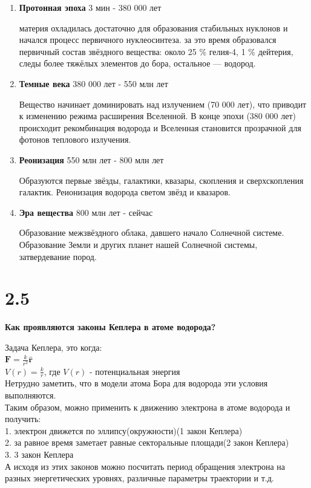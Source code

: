 \documentclass[a4paper,14pt]{article}
\begin{document}
\begin{enumerate}
\item \textbf{Протонная эпоха} 3 мин - 380 000 лет

материя охладилась достаточно для образования стабильных нуклонов и начался процесс первичного нуклеосинтеза. за это время образовался первичный состав звёздного вещества: около 25 $\%$ гелия-4, 1 $\%$ дейтерия, следы более тяжёлых элементов до бора, остальное — водород.

\item \textbf{Темные века} 380 000 лет - 550 млн лет

Вещество начинает доминировать над излучением (70 000 лет), что приводит к изменению режима расширения Вселенной. В конце эпохи (380 000 лет) происходит рекомбинация водорода и Вселенная становится прозрачной для фотонов теплового излучения.

\item \textbf{Реонизация} 550 млн лет - 800 млн лет

Образуются первые звёзды, галактики, квазары, скопления и сверхскопления галактик. Реионизация водорода светом звёзд и квазаров.

\item \textbf{Эра вещества} 800 млн лет - сейчас

Образование межзвёздного облака, давшего начало Солнечной системе. Образование Земли и других планет нашей Солнечной системы, затвердевание пород.
\end{enumerate}

\section*{2.5}

\begin{center}
	\LARGE{\textbf{Как проявляются законы Кеплера в атоме водорода?}}\\
\end{center}

Задача Кеплера, это когда:\\
$\mathbf {F} ={\frac {k}{r^{2}}}\mathbf {\hat {r}}$\\
$V(r)={\frac {k}{r}}$, где $V(r)$ - потенциальная энергия\\
Нетрудно заметить, что в модели атома Бора для водорода эти условия выполняются.\\
Таким образом, можно применить к движению электрона в атоме водорода и получить:\\
1. электрон движется по эллипсу(окружности)(1 закон Кеплера)\\
2. за равное время заметает равные секторальные площади(2 закон Кеплера)\\
3. 3 закон Кеплера\\
А исходя из этих законов можно посчитать период обращения электрона на разных энергетических уровнях, различные параметры траектории и т.д.\\
\end{document}
